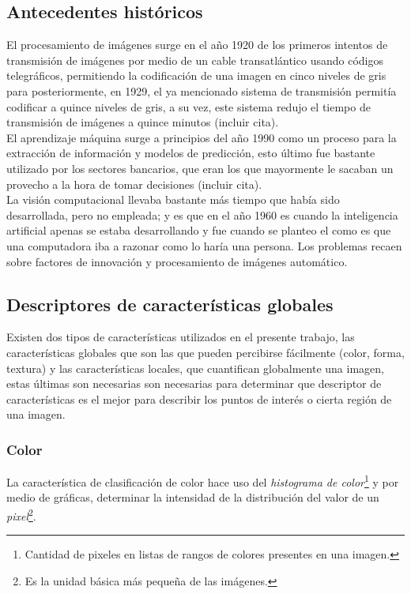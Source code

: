 \documentclass[review]{elsarticle}
\begin{document}
\subsection{Antecedentes históricos}
El procesamiento de imágenes surge en el año 1920 de los primeros intentos de transmisión de imágenes por medio de un cable transatlántico usando códigos telegráficos, permitiendo la codificación de una imagen en cinco niveles de gris para posteriormente, en 1929, el ya mencionado sistema de transmisión permitía codificar a quince niveles de gris, a su vez, este sistema redujo el tiempo de transmisión de imágenes a quince minutos (incluir cita).\\

El aprendizaje máquina surge a principios del año 1990 como un proceso para la extracción de información y modelos de predicción, esto último fue bastante utilizado por los sectores bancarios, que eran los que mayormente le sacaban un provecho a la hora de tomar decisiones (incluir cita).\\ 

La visión computacional llevaba bastante más tiempo que había sido desarrollada, pero no empleada; y es que en el año 1960 es cuando la inteligencia artificial apenas se estaba desarrollando y fue cuando se planteo el como es que una computadora iba a razonar como lo haría una persona. Los problemas recaen sobre factores de innovación y procesamiento de imágenes automático.

\subsection{Descriptores de características globales}
Existen dos tipos de características utilizados en el presente trabajo, las características globales que son las que pueden percibirse fácilmente (color, forma, textura) y las características locales, que cuantifican globalmente una imagen, estas últimas son necesarias son necesarias para determinar que descriptor de características es el mejor para describir los puntos de interés o cierta región de una imagen.
\clearpage

\subsubsection{Color}
La característica de clasificación de color hace uso del \emph{histograma de color}\footnote{Cantidad de pixeles en listas de rangos de colores presentes en una imagen.} y por medio de gráficas, determinar la intensidad de la distribución del valor de un \emph{pixel}\footnote{Es la unidad básica más pequeña de las imágenes.}.
\end{document}
